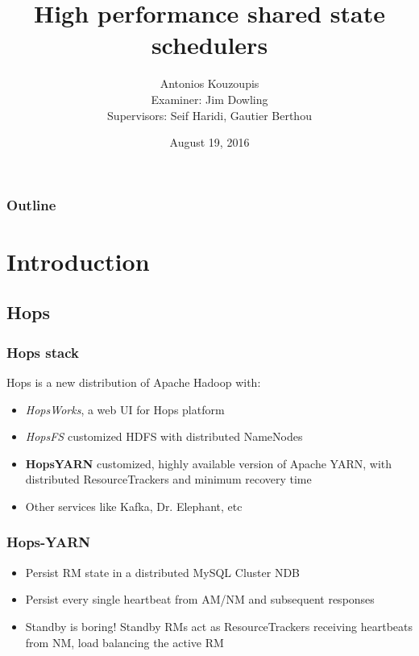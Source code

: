 \documentclass{beamer}
\title{High performance shared state schedulers}
\author[AK]{Antonios Kouzoupis\\[1em]{\footnotesize Examiner: Jim
    Dowling\\Supervisors: Seif Haridi, Gautier Berthou}}
\institute[KTH/SICS]{}
\date[date]{August 19, 2016}
\begin{document}
\section{}
\begin{frame}
\titlepage
\end{frame}

\section*{}
\begin{frame}
\frametitle{Outline}
\footnotesize
\tableofcontents
\normalsize
\end{frame}

\section{Introduction}
\subsection{Hops}
\begin{frame}
\frametitle{Hops stack}
Hops is a new distribution of Apache Hadoop with:
\begin{itemize}
\item \emph{HopsWorks}, a web UI for Hops platform
\item \emph{HopsFS} customized HDFS with distributed NameNodes
\item \textbf{HopsYARN} customized, highly available version of Apache
  YARN, with distributed ResourceTrackers and minimum recovery time
\item Other services like Kafka, Dr. Elephant, etc
\end{itemize}
\end{frame}

\begin{frame}
\frametitle{Hops-YARN}

\begin{itemize}
\item Persist RM state in a distributed MySQL Cluster NDB

\item Persist every single heartbeat from AM/NM and subsequent responses

\item<2-> Standby is boring! Standby RMs act as ResourceTrackers
  receiving heartbeats from NM, load balancing the active RM
\end{itemize}
\end{frame}
\end{document}
